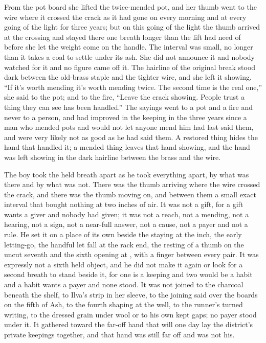 From the pot board she lifted the twice-mended pot, and her thumb went to the wire where it crossed the crack as it had gone on every morning and at every going of the light for three years; but on this going of the light the thumb arrived at the crossing and stayed there one breath longer than the lift had need of before she let the weight come on the handle. The interval was small, no longer than it takes a coal to settle under its ash. She did not announce it and nobody watched for it and no figure came off it. The hairline of the original break stood dark between the old-brass staple and the tighter wire, and she left it showing. “If it's worth mending it's worth mending twice. The second time is the real one,” she said to the pot; and to the fire, “Leave the crack showing. People trust a thing they can see has been handled.” The sayings went to a pot and a fire and never to a person, and had improved in the keeping in the three years since a man who mended pots and would not let anyone mend him had last said them, and were very likely not as good as he had said them. A restored thing hides the hand that handled it; a mended thing leaves that hand showing, and the hand was left showing in the dark hairline between the brass and the wire.

The boy took the held breath apart as he took everything apart, by what was there and by what was not. There was the thumb arriving where the wire crossed the crack, and there was the thumb moving on, and between them a small exact interval that bought nothing at two inches of air. It was not a gift, for a gift wants a giver and nobody had given; it was not a reach, not a mending, not a hearing, not a sign, not a near-full answer, not a cause, not a payer and not a rule. He set it on a place of its own beside the staying at the inch, the early letting-go, the handful let fall at the rack end, the resting of a thumb on the uncut seventh and the sixth opening at , with a finger between every pair. It was expressly not a sixth held object, and he did not make it again or look for a second breath to stand beside it, for one is a keeping and two would be a habit and a habit wants a payer and none stood. It was not joined to the charcoal beneath the shelf, to Ilva's strip in her sleeve, to the joining said over the boards on the fifth of Ash, to the fourth shaping at the well, to the runner's turned writing, to the dressed grain under wool or to his own kept gaps; no payer stood under it. It gathered toward the far-off hand that will one day lay the district's private keepings together, and that hand was still far off and was not his.

